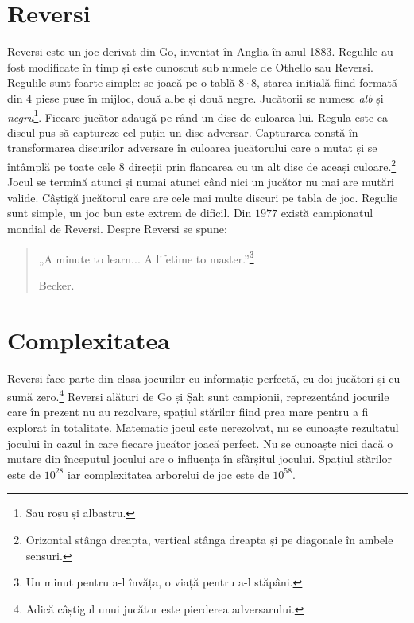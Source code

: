 \documentclass[11pt,twocolumn,a4paper]{article}
\begin{document}
\section*{Reversi}
Reversi este un joc derivat din Go, inventat în Anglia în anul 1883. Regulile au fost modificate în timp și este cunoscut sub numele de Othello sau Reversi. Regulile sunt foarte simple: se joacă pe o tablă $8 \cdot 8$, starea inițială fiind formată din 4 piese puse în mijloc, două albe și două negre. Jucătorii se numesc \emph{alb} și \emph{negru}\footnote{Sau roșu și albastru.}. Fiecare jucător adaugă pe rând un disc de culoarea lui. Regula este ca discul pus să captureze cel puțin un disc adversar. Capturarea constă în transformarea discurilor adversare în culoarea jucătorului care a mutat și se întâmplă pe toate cele 8 direcții prin flancarea cu un alt disc de aceași culoare.\footnote{Orizontal stânga dreapta, vertical stânga dreapta și pe diagonale în ambele sensuri.} Jocul se termină atunci și numai atunci când nici un jucător nu mai are mutări valide. Câștigă jucătorul care are cele mai multe discuri pe tabla de joc. Regulie sunt simple, un joc bun este extrem de dificil. Din $1977$ există campionatul mondial de Reversi.\cite{Brian} Despre Reversi se spune:
\begin{quote}
„A minute to learn... A lifetime to master.”\footnote{Un minut pentru a-l învăța, o viață pentru a-l stăpâni.}
	\begin{flushright}   
		Becker.
	\end{flushright}
\end{quote}
\section*{Complexitatea}
Reversi face parte din clasa jocurilor cu informație perfectă, cu doi jucători și cu sumă zero.\footnote{Adică câștigul unui jucător este pierderea adversarului.}
Reversi alături de Go și Șah sunt campionii, reprezentând jocurile care în prezent nu au rezolvare, spațiul stărilor fiind prea mare pentru a fi explorat în totalitate.\cite{Herik} Matematic jocul este nerezolvat, nu se cunoaște rezultatul jocului în cazul în care fiecare jucător joacă perfect. Nu se cunoaște nici dacă o mutare din începutul jocului are o influența în sfârșitul jocului. Spațiul stărilor este de $10^{28}$ iar complexitatea arborelui de joc este de $10^{58}$.\cite{Allis}
\end{document}
